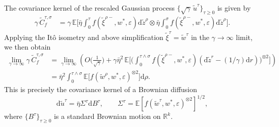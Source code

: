 \documentclass[11pt,letterpaper,reqno]{amsart}
\theoremstyle{definition}
\def\eps{\varepsilon}
\def\d{\mathrm{d}}
\def\E{\mathbb{E}}
\def\R{\mathbb{R}}
\begin{document}
The covariance kernel of the rescaled Gaussian process $\{\sqrt{\gamma}\,\tilde
u^\tau\}_{\tau \geq 0}$ is given by
\begin{align*}
\gamma\,\tilde C_f^{\tau,\sigma} &= \gamma\,\E\Big[\bar\eta \int_0^\tau
f(\tilde\xi^{\rho-},w^*,\eps)\d \tilde z^\rho
\otimes \bar\eta\int_0^\sigma f(\tilde\xi^{\rho-},w^*,\eps)\d \tilde
z^\rho\Big].
\end{align*}
Applying the It\^o isometry and above simplification
$\tilde \xi^\tau=\tilde w^\tau$ in the $\gamma \to \infty$ limit,
we then obtain
\begin{align*}
\lim_{\gamma \to \infty} \gamma\,\tilde C_f^{\tau,\sigma}
&=\lim_{\gamma \to \infty}\left(O\Big(\frac{1}{\sqrt{\gamma}}\Big) +
\gamma\bar\eta^2\,\E\Big[\Big(\int_0^{\tau\wedge\sigma} f(\tilde
\xi^{\rho-},w^*,\eps)(\d \tilde z^r - (1/\gamma)\d r)\Big)^{\otimes
2}\Big]\right)\\
&=\bar \eta^2\int_0^{\tau\wedge\sigma} \E\Big[
f(\tilde w^\rho,w^*,\eps)^{\otimes 2}\Big]\d \rho.
\end{align*}
This is precisely the covariance kernel of a Brownian diffusion
\[\d \tilde u^\tau=\bar\eta \Sigma^\tau\d B^\tau,
\qquad \Sigma^\tau=\E[f(\tilde w^\tau,w^*,\eps)^{\otimes 2}]^{1/2},\]
where $\{B^\tau\}_{\tau \geq 0}$ is a standard Brownian motion on $\R^k$.
\end{document}
